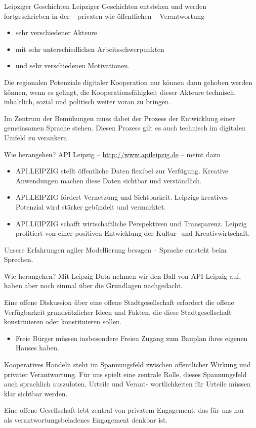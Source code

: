 \documentclass{beamer}
\begin{document}
\begin{frame}{Leipziger Geschichten}{}
Leipziger Geschichten entstehen und werden fortgeschrieben in der – privaten
wie öffentlichen – Verantwortung
\begin{itemize}
\item sehr verschiedener Akteure
\item mit sehr unterschiedlichen Arbeitsschwerpunkten
\item und sehr verschiedenen Motivationen. 
\end{itemize}
Die regionalen {Potenziale digitaler Kooperation} nur können dann gehoben
werden können, wenn es gelingt, die Kooperations{fähigkeit} dieser Akteure
technisch, inhaltlich, sozial und politisch weiter voran zu bringen.
\medskip

Im Zentrum der Bemühungen muss dabei der {Prozess der Entwicklung einer
  gemeinsamen Sprache} stehen. Diesen Prozess gilt es auch technisch im
digitalen Umfeld zu verankern.
\end{frame}

\begin{frame}{Wie herangehen?}{}
API Leipzig – \url{http://www.apileipzig.de} – meint dazu
\begin{itemize}
\item API.LEIPZIG stellt öffentliche Daten flexibel zur Verfügung. Kreative
  Anwendungen machen diese Daten sichtbar und verständlich.
\item API.LEIPZIG fördert Vernetzung und Sichtbarkeit. Leipzigs kreatives
  Potenzial wird stärker gebündelt und vermarktet.
\item API.LEIPZIG schafft wirtschaftliche Perspektiven und Transparenz.
  Leipzig profitiert von einer positiven Entwicklung der Kultur- und
  Kreativwirtschaft.
\end{itemize}
Unsere Erfahrungen {agiler} Modellierung besagen – Sprache entsteht beim
Sprechen.
\end{frame}

\begin{frame}{Wie herangehen?}{}
Mit {Leipzig Data} nehmen wir den Ball von API Leipzig auf, haben aber
noch einmal über die Grundlagen nachgedacht.\medskip

Eine {offene} Diskussion über eine {offene} Stadtgesellschaft
erfordert die {offene} Verfügbarkeit grundsätzlicher Ideen und Fakten, die
diese Stadtgesellschaft konstituieren oder konstituieren sollen.
\begin{itemize}
\item[] Freie Bürger müssen insbesondere Freien Zugang zum {Bauplan ihres
  eigenen Hauses} haben.
\end{itemize}
Kooperatives Handeln steht im Spannungsfeld zwischen öffentlicher
Wirkung und privater Verantwortung. Für uns spielt eine zentrale Rolle,
dieses Spannungsfeld auch sprachlich auszuloten. Urteile und Verant-
wortlichkeiten für Urteile müssen klar sichtbar werden.\medskip

Eine offene Gesellschaft lebt zentral von privatem Engagement, das für
uns nur als verantwortungsbeladenes Engagement denkbar ist.
\end{frame}
\end{document}
